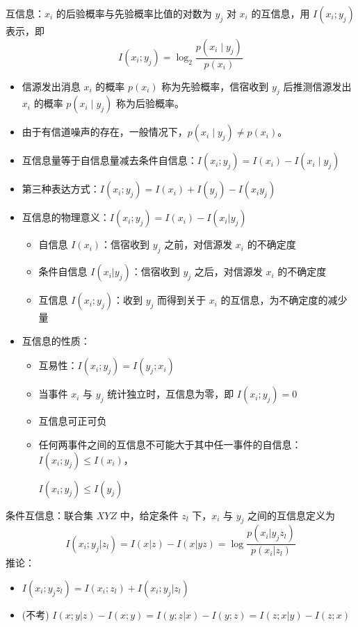 \begin{remark}
    互信息：$x_i$ 的后验概率与先验概率比值的对数为 $y_j$ 对 $x_i$ 的互信息，用 $I(x_i;y_j)$ 表示，即 \[I\left(x_{i} ; y_{j}\right)=\log _{2} \frac{p\left(x_{i} \mid  y_{j}\right)}{p\left(x_{i}\right)} \]
    \begin{itemize}
        \item 信源发出消息 $x_i$ 的概率 $p(x_i)$ 称为先验概率，信宿收到 $y_j$ 后推测信源发出 $x_i$ 的概率 $p(x_i\mid y_j)$ 称为后验概率。
        \item 由于有信道噪声的存在，一般情况下，$p(x_i\mid y_j) \neq p(x_i)$。
        \item 互信息量等于自信息量减去条件自信息：$I\left(x_{i} ; y_{j}\right) = I\left(x_{i}\right)-I\left(x_{i} \mid  y_{j}\right)$
        \item 第三种表达方式：$I(x_i; y_j) = I(x_i) + I(y_j) - I(x_iy_j)$
        \item 互信息的物理意义：$I(x_i;y_j) = I(x_i) - I(x_i|y_j)$ \begin{itemize}
            \item 自信息 $I(x_i)$：信宿收到 $y_j$ 之前，对信源发 $x_i$ 的不确定度
            \item 条件自信息 $I(x_i|y_j)$：信宿收到 $y_j$ 之后，对信源发 $x_i$ 的不确定度
            \item 互信息 $I(x_i; y_j)$：收到 $y_j$ 而得到关于 $x_i$ 的互信息，为不确定度的减少量
        \end{itemize}
        \item 互信息的性质：
        \begin{itemize}
            \item 互易性：$I(x_i; y_j) = I(y_j; x_i)$
            \item 当事件 $x_i$ 与 $y_j$ 统计独立时，互信息为零，即 $I(x_i; y_j) = 0$
            \item 互信息可正可负
            \item 任何两事件之间的互信息不可能大于其中任一事件的自信息：$I(x_i; y_j) \le I(x_i)$，\begin{sloppypar}$I(x_i;y_j) \le I(y_j)$\end{sloppypar}
        \end{itemize}
    \end{itemize}
\end{remark}

\begin{remark}
    条件互信息：联合集 $XYZ$ 中，给定条件 $z_l$ 下，$x_i$ 与 $y_j$ 之间的互信息定义为 \[I(x_i; y_j | z_l) = I(x|z) - I(x|yz) = \log\frac{p(x_i|y_jz_l)}{p(x_i|z_l)} \]
    推论：
    \begin{itemize}
        \item $I(x_i;y_jz_l) = I(x_i; z_l) + I(x_i; y_j | z_l)$
        \item (不考) $I(x; y|z) - I(x;y) = I(y;z|x) - I(y;z) = I(z;x|y) - I(z;x)$
    \end{itemize}
\end{remark}

